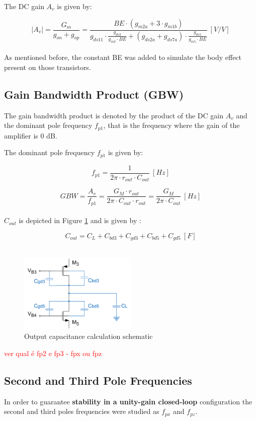 The DC gain $A_v$ is given by:

$$|A_v| = \frac{G_m}{g_{on} + g_{op}} = \frac{BE \cdot (g_{m2a} + 3 \cdot g_{m1b})}{g_{ds11} \cdot \frac{g_{ds3}}{g_{m3}\cdot BE} + (g_{ds2a} + g_{ds7a}) \cdot \frac{g_{ds5}}{g_{m5} \cdot BE}} \ [V/V]$$ \\

As mentioned before, the constant BE was added to simulate the body effect present on those transistors.

\subsection{Gain Bandwidth Product (GBW)}
The gain bandwidth product is denoted by the product of the DC gain $A_v$ and the dominant pole frequency $f_{p1}$, that is the frequency where the gain of the amplifier is 0 dB. 

The dominant pole frequency $f_{p1}$ is given by:

$$f_{p1} = \frac{1}{2\pi \cdot r_{out} \cdot C_{out}} \ [Hz]$$

$$  GBW = \frac{A_v}{f_{p1}} = \frac{G_M \cdot r_{out}}{2\pi \cdot C_{out} \cdot r_{out}}=\frac{G_M}{2\pi \cdot C_{out}} \ [Hz] $$ \\

$C_{out}$ is depicted in Figure \ref{fig:cout_sch} and is given by :

$$C_{out} = C_L + C_{bd3} + C_{gd3} + C_{bd5} + C_{gd5} \ [F] $$ \\

\begin{figure}[H]
    \centering
    \includegraphics[width=0.5\textwidth]{Images/Cout_sch.png}
    \caption{Output capacitance calculation schematic}
    \label{fig:cout_sch}
\end{figure}


\textcolor{red}{ver qual é fp2 e fp3 - fpx ou fpz }

\subsection{Second and Third Pole Frequencies}
In order to guarantee \textbf{stability in a unity-gain closed-loop} configuration the second and third poles frequencies were studied as $f_{px}$ and  $f_{pz}$.

